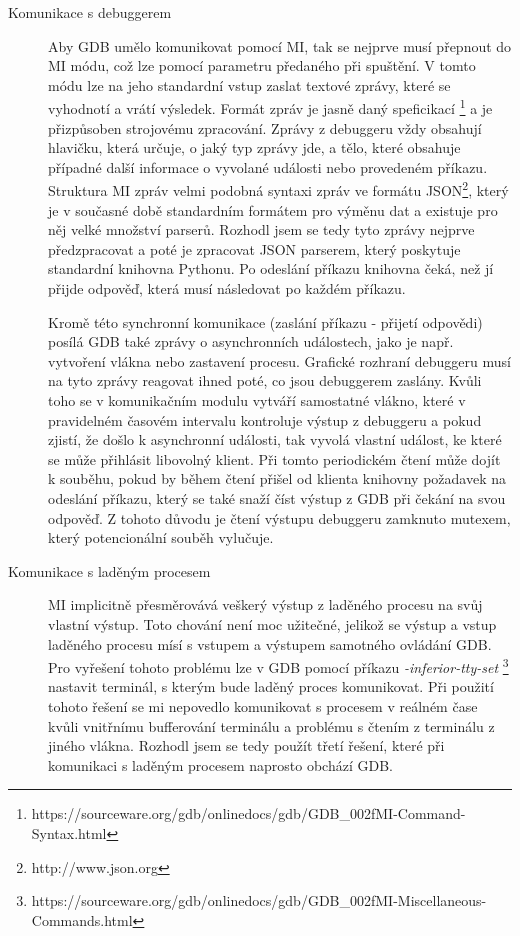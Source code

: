 \documentclass[bc,male,python,dept460]{diploma}						%
\begin{document}
		\begin{description}
			\item[Komunikace s debuggerem]
			Aby GDB umělo komunikovat pomocí MI, tak se nejprve musí přepnout do MI módu, což lze pomocí parametru předaného při spuštění. V tomto módu
			lze na jeho standardní vstup zaslat textové zprávy, které se vyhodnotí a vrátí výsledek. Formát zpráv je jasně daný speficikací
			\footnote{https://sourceware.org/gdb/onlinedocs/gdb/GDB\_002fMI-Command-Syntax.html} a je přizpůsoben strojovému zpracování. Zprávy z debuggeru
			vždy obsahují hlavičku, která určuje, o jaký typ zprávy jde, a tělo, které obsahuje případné další informace o vyvolané události nebo
			provedeném příkazu. Struktura MI zpráv velmi podobná syntaxi zpráv ve formátu JSON\footnote{http://www.json.org}, který je v současné době standardním
			formátem pro výměnu dat a existuje pro něj velké množství parserů.
			Rozhodl jsem se tedy tyto zprávy nejprve předzpracovat a poté je zpracovat JSON parserem, který poskytuje
			standardní knihovna Pythonu. %
			Po odeslání příkazu knihovna čeká, než jí přijde odpověď, která musí následovat po každém příkazu.
			
			\par Kromě této synchronní komunikace (zaslání příkazu - přijetí odpovědi) posílá GDB také zprávy o asynchronních událostech, jako je např.
			vytvoření vlákna nebo zastavení procesu. Grafické rozhraní debuggeru musí na tyto zprávy reagovat ihned poté, co jsou debuggerem zaslány.
			Kvůli toho se v komunikačním modulu vytváří samostatné vlákno, které v pravidelném časovém intervalu kontroluje výstup z debuggeru a pokud zjistí, že došlo
			k asynchronní události, tak vyvolá vlastní událost, ke které se může přihlásit libovolný klient. Při tomto periodickém čtení může dojít k souběhu, pokud
			by během čtení přišel od klienta knihovny požadavek na odeslání příkazu, který se také snaží číst výstup z GDB při čekání na svou odpověď.
			Z tohoto důvodu je čtení výstupu debuggeru zamknuto mutexem, který potencionální souběh vylučuje.
			
			\item[Komunikace s laděným procesem]
			MI implicitně přesměrovává veškerý výstup z laděného procesu na svůj vlastní výstup. Toto chování není moc užitečné, jelikož se výstup a vstup laděného
			procesu mísí s vstupem a výstupem samotného ovládání GDB. Pro vyřešení tohoto problému lze v GDB pomocí příkazu \textit{-inferior-tty-set}
			\footnote{https://sourceware.org/gdb/onlinedocs/gdb/GDB\_002fMI-Miscellaneous-Commands.html} nastavit terminál, s kterým bude laděný proces komunikovat.
			Při použití tohoto řešení se mi nepovedlo komunikovat s procesem v reálném čase kvůli vnitřnímu bufferování terminálu a problému s čtením z terminálu z
			jiného vlákna. %
			Rozhodl jsem se tedy použít třetí řešení, které při komunikaci s laděným procesem naprosto obchází GDB.
			

\end{description}
\end{document}
